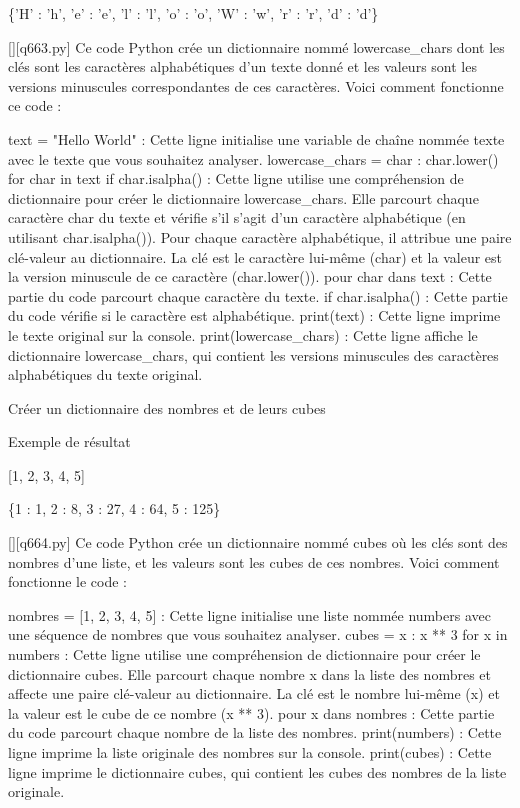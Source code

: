 \{'H' : 'h', 'e' : 'e', 'l' : 'l', 'o' : 'o', 'W' : 'w', 'r' : 'r', 'd' : 'd'\}
        \par
        \begin{solution}
            \renewcommand{\nomfichier}{q663.py}
            \pythonfile{\chemincode \nomfichier}[][\nomfichier]
            Ce code Python crée un dictionnaire nommé lowercase_chars dont les clés sont les caractères alphabétiques d'un texte donné et les valeurs sont les versions minuscules correspondantes de ces caractères. Voici comment fonctionne ce code :

    text = "Hello World" : Cette ligne initialise une variable de chaîne nommée texte avec le texte que vous souhaitez analyser.
    lowercase_chars = {char : char.lower() for char in text if char.isalpha()} : Cette ligne utilise une compréhension de dictionnaire pour créer le dictionnaire lowercase_chars. Elle parcourt chaque caractère char du texte et vérifie s'il s'agit d'un caractère alphabétique (en utilisant char.isalpha()). Pour chaque caractère alphabétique, il attribue une paire clé-valeur au dictionnaire. La clé est le caractère lui-même (char) et la valeur est la version minuscule de ce caractère (char.lower()).
        pour char dans text : Cette partie du code parcourt chaque caractère du texte.
        if char.isalpha() : Cette partie du code vérifie si le caractère est alphabétique.
    print(text) : Cette ligne imprime le texte original sur la console.
    print(lowercase_chars) : Cette ligne affiche le dictionnaire lowercase_chars, qui contient les versions minuscules des caractères alphabétiques du texte original.
        \end{solution}
        

        \question
        Créer un dictionnaire des nombres et de leurs cubes

Exemple de résultat

[1, 2, 3, 4, 5]

\{1 : 1, 2 : 8, 3 : 27, 4 : 64, 5 : 125\}
        \par
        \begin{solution}
            \renewcommand{\nomfichier}{q664.py}
            \pythonfile{\chemincode \nomfichier}[][\nomfichier]
            Ce code Python crée un dictionnaire nommé cubes où les clés sont des nombres d'une liste, et les valeurs sont les cubes de ces nombres. Voici comment fonctionne le code :

    nombres = [1, 2, 3, 4, 5] : Cette ligne initialise une liste nommée numbers avec une séquence de nombres que vous souhaitez analyser.
    cubes = {x : x ** 3 for x in numbers} : Cette ligne utilise une compréhension de dictionnaire pour créer le dictionnaire cubes. Elle parcourt chaque nombre x dans la liste des nombres et affecte une paire clé-valeur au dictionnaire. La clé est le nombre lui-même (x) et la valeur est le cube de ce nombre (x ** 3).
        pour x dans nombres : Cette partie du code parcourt chaque nombre de la liste des nombres.
    print(numbers) : Cette ligne imprime la liste originale des nombres sur la console.
    print(cubes) : Cette ligne imprime le dictionnaire cubes, qui contient les cubes des nombres de la liste originale.
        \end{solution}
        

